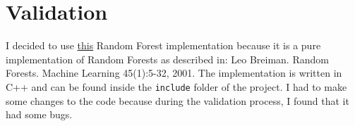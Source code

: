 \section{Validation}

I decided to use \href{https://github.com/bjoern-andres/random-forest}{this} Random Forest implementation because it is a pure implementation of Random Forests as described in: Leo Breiman. Random Forests. Machine Learning 45(1):5-32, 2001.
The implementation is written in C++ and can be found inside the \texttt{include} folder of the project. I had to make some changes to the code because during the validation process, I found that it had some bugs. 